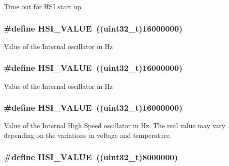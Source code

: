 Time out for H\-S\-I start up \hypertarget{group___library__configuration__section_gaaa8c76e274d0f6dd2cefb5d0b17fbc37}{
\subsubsection[{H\-S\-I\-\_\-\-V\-A\-L\-U\-E}]{\setlength{\rightskip}{0pt plus 5cm}\#define H\-S\-I\-\_\-\-V\-A\-L\-U\-E~((uint32\-\_\-t)16000000)}}\label{group___library__configuration__section_gaaa8c76e274d0f6dd2cefb5d0b17fbc37}
Value of the Internal oscillator in Hz \hypertarget{group___library__configuration__section_gaaa8c76e274d0f6dd2cefb5d0b17fbc37}{
\subsubsection[{H\-S\-I\-\_\-\-V\-A\-L\-U\-E}]{\setlength{\rightskip}{0pt plus 5cm}\#define H\-S\-I\-\_\-\-V\-A\-L\-U\-E~((uint32\-\_\-t)16000000)}}\label{group___library__configuration__section_gaaa8c76e274d0f6dd2cefb5d0b17fbc37}
Value of the Internal oscillator in Hz \hypertarget{group___library__configuration__section_gaaa8c76e274d0f6dd2cefb5d0b17fbc37}{
\subsubsection[{H\-S\-I\-\_\-\-V\-A\-L\-U\-E}]{\setlength{\rightskip}{0pt plus 5cm}\#define H\-S\-I\-\_\-\-V\-A\-L\-U\-E~((uint32\-\_\-t)16000000)}}\label{group___library__configuration__section_gaaa8c76e274d0f6dd2cefb5d0b17fbc37}
Value of the Internal High Speed oscillator in Hz. The real value may vary depending on the variations in voltage and temperature. \hypertarget{group___library__configuration__section_gaaa8c76e274d0f6dd2cefb5d0b17fbc37}{
\subsubsection[{H\-S\-I\-\_\-\-V\-A\-L\-U\-E}]{\setlength{\rightskip}{0pt plus 5cm}\#define H\-S\-I\-\_\-\-V\-A\-L\-U\-E~((uint32\-\_\-t)8000000)}}\label{group___library__configuration__section_gaaa8c76e274d0f6dd2cefb5d0b17fbc37}
